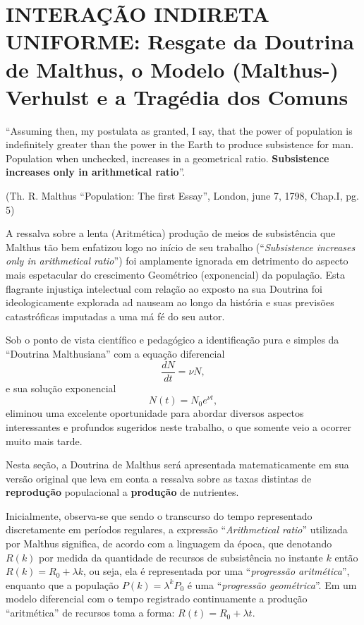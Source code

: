 \section{INTERAÇÃO INDIRETA UNIFORME: Resgate da Doutrina de Malthus, o Modelo (Malthus-) Verhulst e a Tragédia dos Comuns}

\begin{citacao}
    ``Assuming then, my postulata as granted, I say, that the power of population is  indefinitely greater than the power in the Earth to produce subsistence for man. Population when unchecked, increases in a geometrical ratio. \textbf{Subsistence increases only in arithmetical ratio}''.

    (Th. R. Malthus ``Population: The first Essay'', London, june 7, 1798, Chap.I, pg. 5)
\end{citacao}

    A ressalva sobre a lenta (Aritmética) produção de meios de subsistência que Malthus tão bem enfatizou logo no início de seu trabalho (``\textit{Subsistence increases only in arithmetical ratio}'') foi amplamente ignorada em detrimento do aspecto mais espetacular do crescimento Geométrico (exponencial) da população. Esta flagrante injustiça intelectual com relação ao exposto na sua Doutrina foi ideologicamente explorada ad nauseam ao longo da história e suas previsões catastróficas imputadas a uma má fé do seu autor. 

    Sob o ponto de vista científico e pedagógico a identificação pura e simples da ``Doutrina Malthusiana'' com a equação diferencial
    \[\dfrac{dN}{dt} = \nu N,\]
    e sua solução exponencial
    \[N(t) = N_0 e^{\nu t},\]
    eliminou uma excelente oportunidade para abordar diversos aspectos interessantes e profundos sugeridos neste trabalho, o que somente veio a ocorrer muito mais tarde.
    
    Nesta seção, a Doutrina de Malthus será apresentada matematicamente em sua versão original que leva em conta a ressalva sobre as taxas distintas de \textbf{reprodução} populacional a \textbf{produção} de nutrientes.

    Inicialmente, observa-se que sendo o transcurso do tempo representado discretamente em períodos regulares, a expressão ``\textit{Arithmetical ratio}'' utilizada por Malthus significa, de acordo com a linguagem da época, que denotando \(R(k)\) por medida da quantidade de recursos de subsistência no instante \(k\) então \(R(k) = R_0+\lambda k\), ou seja, ela é representada por uma ``\textit{progressão aritmética}'', enquanto que a população \(P(k) = \lambda^k P_0\) é uma ``\textit{progressão geométrica}''. Em um modelo diferencial com o tempo registrado continuamente a produção ``aritmética'' de recursos toma a forma: \(R(t) = R_0 + \lambda t\).

